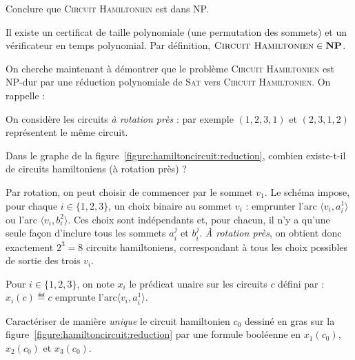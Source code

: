 \begin{exercice}[\textsc{Circuit Hamiltonien} est NP-complet%
    \footnote{Vidéo détaillée de la réduction de \textsc{3-SAT} à \textsc{Cycle Hamiltonien} : \url{https://www.youtube.com/watch?v=OHnX-R_SBpM}}]
  \begin{question}
  \item Conclure que \textsc{Circuit Hamiltonien} est dans NP.
  \end{question}
  \begin{correction}
    Il existe un certificat de taille polynomiale (une permutation des sommets) et un vérificateur en temps polynomial.  
    Par définition, $\textsc{Circuit Hamiltonien} \in \mathbf{NP}$.
  \end{correction}

  \ifnotcorrection{\pagebreak}
  On cherche maintenant à démontrer que le problème \textsc{Circuit Hamiltonien} est NP-dur par une réduction polynomiale de \textsc{Sat} vers \textsc{Circuit Hamiltonien}.
  On rappelle :


  On considère les circuits \emph{à rotation près} : par exemple $(1,2,3,1)$ et $(2,3,1,2)$ représentent le même circuit.

  \ifcorrection{\newpage}
  \begin{question}
  \item Dans le graphe de la figure~\ref{figure:hamiltoncircuit:reduction}, combien existe-t-il de circuits hamiltoniens (à rotation près) ? 
  \end{question}
  \begin{correction}
    Par rotation, on peut choisir de commencer par le sommet $v_1$. Le schéma impose, pour chaque $i\in\{1,2,3\}$,
    un choix binaire au sommet $v_i$ : emprunter l'arc $\langle v_i,a_i^1\rangle$ ou l'arc $\langle v_i, b_i^2\rangle$.  
    Ces choix sont indépendants et, pour chacun, il n'y a qu'une seule façon d'inclure tous les sommets $a_i^j$ et $b_i^j$. 
    \emph{À rotation près}, on obtient donc exactement $2^3=8$ circuits hamiltoniens,
    correspondant à tous les choix possibles de sortie des trois $v_i$.
  \end{correction}
  
  Pour $i \in \{1,2,3\}$, on note $x_i$ le prédicat unaire sur les circuits $c$ défini par :
  $x_i(c) \eqdef \text{$c$ emprunte l'arc}\langle v_i, a_i^1\rangle$.

  \begin{question}
  \item Caractériser de manière \emph{unique} le circuit hamiltonien $c_0$ dessiné en gras sur la figure~\ref{figure:hamiltoncircuit:reduction}
    par une formule booléenne en $x_1(c_0)$, $x_2(c_0)$ et $x_3(c_0)$.
  \end{question}


\end{exercice}
